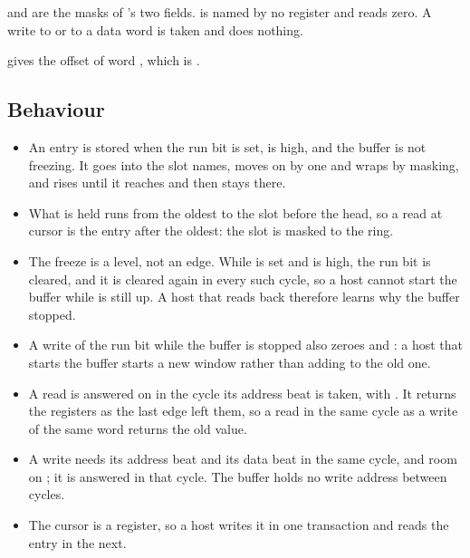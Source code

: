 
 and  are the masks of
's two fields.  is named by no register and reads
zero. A write to  or to a data word is taken and does
nothing.

 gives the offset of word , which is
.


\subsection*{Behaviour}

\begin{itemize}
\item An entry is stored when the run bit is set,  is high,
and the buffer is not freezing. It goes into the slot 
names,  moves on by one and wraps by masking, and
 rises until it reaches  and then stays there.
\item What is held runs from the oldest to the slot before the head, so
a read at cursor  is the entry  after the oldest:
the slot is  masked to the ring.
\item The freeze is a level, not an edge. While  is
set and  is high, the run bit is cleared, and it is cleared
again in every such cycle, so a host cannot start the buffer while
 is still up. A host that reads  back therefore
learns why the buffer stopped.
\item A write of the run bit while the buffer is stopped also zeroes
 and : a host that starts the buffer starts a
new window rather than adding to the old one.
\item A read is answered on  in the cycle its address beat is
taken, with . It returns the registers as the last edge left
them, so a read in the same cycle as a write of the same word returns
the old value.
\item A write needs its address beat and its data beat in the same
cycle, and room on ; it is answered  in that cycle.
The buffer holds no write address between cycles.
\item The cursor is a register, so a host writes it in one transaction
and reads the entry in the next.
\end{itemize}

